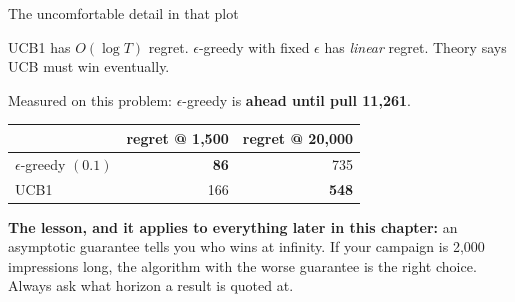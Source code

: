 \documentclass[aspectratio=169]{beamer}
\begin{document}
\begin{frame}{The uncomfortable detail in that plot}
  \begin{tcolorbox}[colback=armorange!12, colframe=armorange, boxrule=0.8pt, arc=2pt,
                    title={\textbf{UCB has the better guarantee and still loses -- for a while}}]
    \small
    UCB1 has $O(\log T)$ regret. $\epsilon$-greedy with fixed $\epsilon$ has \emph{linear}
    regret. Theory says UCB must win eventually.

    \vskip 6pt
    Measured on this problem: $\epsilon$-greedy is \textbf{ahead until pull 11{,}261}.

    \vskip 6pt
    \begin{center}
    \begin{tabular}{l r r}
      \toprule
      & \textbf{regret @ 1{,}500} & \textbf{regret @ 20{,}000} \\
      \midrule
      $\epsilon$-greedy $(0.1)$ & \textbf{86} & 735 \\
      UCB1 & 166 & \textbf{548} \\
      \bottomrule
    \end{tabular}
    \end{center}
  \end{tcolorbox}

  \vskip 8pt
  \small
  \textbf{The lesson, and it applies to everything later in this chapter:} an asymptotic
  guarantee tells you who wins at infinity. If your campaign is 2{,}000 impressions long, the
  algorithm with the worse guarantee is the right choice. Always ask what horizon a result is
  quoted at.
\end{frame}
\end{document}
